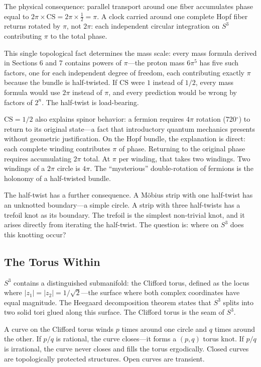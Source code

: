 \documentclass[12pt]{article}
\begin{document}
\medskip
The physical consequence: parallel transport around one fiber accumulates phase equal to $2\pi \times \mathrm{CS} = 2\pi \times \frac{1}{2} = \pi$. A clock carried around one complete Hopf fiber returns rotated by $\pi$, not $2\pi$: each independent circular integration on $S^3$ contributing $\pi$ to the total phase.

This single topological fact determines the mass scale: every mass formula derived in Sections 6 and 7 contains powers of $\pi$---the proton mass $6\pi^5$ has five such factors, one for each independent degree of freedom, each contributing exactly $\pi$ because the bundle is half-twisted. If $\mathrm{CS}$ were $1$ instead of $1/2$, every mass formula would use $2\pi$ instead of $\pi$, and every prediction would be wrong by factors of $2^n$. The half-twist is load-bearing.

$\mathrm{CS} = 1/2$ also explains spinor behavior: a fermion requires $4\pi$ rotation (720$^\circ$) to return to its original state---a fact that introductory quantum mechanics presents without geometric justification. On the Hopf bundle, the explanation is direct: each complete winding contributes $\pi$ of phase. Returning to the original phase requires accumulating $2\pi$ total. At $\pi$ per winding, that takes two windings. Two windings of a $2\pi$ circle is $4\pi$. The ``mysterious'' double-rotation of fermions is the holonomy of a half-twisted bundle.

The half-twist has a further consequence. A M\"obius strip with one half-twist has an unknotted boundary---a simple circle. A strip with three half-twists has a trefoil knot as its boundary. The trefoil is the simplest non-trivial knot, and it arises directly from iterating the half-twist. The question is: where on $S^3$ does this knotting occur?

\subsection{The Torus Within}

$S^3$ contains a distinguished submanifold: the Clifford torus, defined as the locus where $|z_1| = |z_2| = 1/\sqrt{2}$---the surface where both complex coordinates have equal magnitude. The Heegaard decomposition theorem states that $S^3$ splits into two solid tori glued along this surface. The Clifford torus is the seam of $S^3$.

A curve on the Clifford torus winds $p$ times around one circle and $q$ times around the other. If $p/q$ is rational, the curve closes---it forms a $(p,q)$ torus knot. If $p/q$ is irrational, the curve never closes and fills the torus ergodically. Closed curves are topologically protected structures. Open curves are transient.
\end{document}
